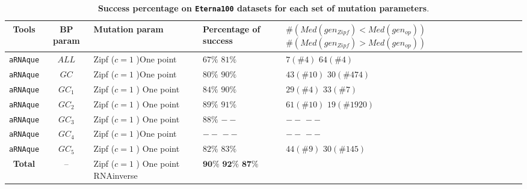 \begin{table}[t!]
	\caption{\textbf{Success percentage on \texttt{Eterna100} datasets for each set of mutation parameters}.}
	\centering
	\vspace*{0.5cm}
	\hspace*{-3cm}
	\begin{tabular}[H]{|c|c|p{30mm}|p{25mm}|p{60mm}|}
		\hline 
		\textbf{Tools} &\textbf{BP param}&\textbf{Mutation param}& \textbf{Percentage of success}&\textbf{$\#(Med(gen_{Zipf}) < Med(gen_{op})) $} \newline \textbf{ $\#(Med(gen_{Zipf}) > Med(gen_{op}) )$}\\
		\hline 
		\texttt{aRNAque} & $ALL$& Zipf ($c=1$ )\newline One point & $67\%$ \newline $81\%$ & $7(\# 4)$ \newline $64(\# 4)$\\
		\hline
		\texttt{aRNAque} & $GC$& Zipf ($c=1$ )\newline One point  & $80\%$ \newline $90\%$ &$43(\# 10)$ \newline $30(\# 474)$ \\
		\hline
		\texttt{aRNAque} & $GC_1$& Zipf ($c=1$ ) \newline One point  & $84\%$ \newline $90\%$ &$29(\# 4)$ \newline $33(\# 7)$ \\
		\hline
		\texttt{aRNAque} &  $GC_2$&Zipf ($c=1$ ) \newline One point &  $89\%$ \newline $91\%$ & $61(\# 10)$ \newline $19(\# 1920)$ \\
		\hline
		\texttt{aRNAque} &  $GC_3$ & Zipf ($c=1$ )  \newline One point  &  $88\%$ \newline $--$& $--$ \newline $--$\\
		\hline
		\texttt{aRNAque} & $GC_4$& Zipf ($c=1$ )\newline One point &  $--$ \newline $--$ & $--$ \newline $--$\\
		\hline
		\texttt{aRNAque} &  $GC_5$& Zipf ($c=1$ )  \newline One point &  $82\%$ \newline $83\%$ &$44(\# 9)$ \newline $30(\# 145)$ \\
		\hline
		\textbf{Total}  & -- & Zipf ($c=1$ ) \newline One point  \newline RNAinverse &$\textbf{90\%}$ \newline $\textbf{92\%}$ \newline $\textbf{87\%}$ &\\
		\hline
	\end{tabular}
	\label{app:tab:summary}
\end{table}

